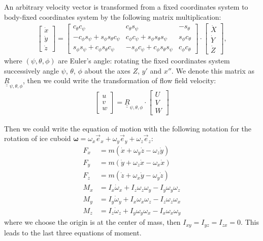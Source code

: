 \documentclass[a4paper, 12pt]{book}
\begin{document}
An arbitrary velocity vector is transformed from a fixed coordinates system to body-fixed coordinates system by the following matrix multiplication:
\begin{align}
    \begin{bmatrix}
        \dot{x} \\
        \dot{y} \\
        \dot{z}
    \end{bmatrix}
    =
    \begin{bmatrix}
        c_\theta c_\psi & c_\theta s_\psi & -s_\theta \\
        -c_\phi s_\psi + s_\phi s_\theta c_\psi & c_\phi c_\psi + s_\phi s_\theta s_\psi & s_\phi c_\theta \\
        s_\phi s_\psi + c_\phi s_\theta c_\psi & -s_\phi c_\psi + c_\phi s_\theta s_\psi & c_\phi c_\theta
    \end{bmatrix}\cdot
    \begin{bmatrix}
        \dot{X} \\
        \dot{Y} \\
        \dot{Z}
    \end{bmatrix},
\end{align}
where $(\psi, \theta, \phi)$ are Euler's angle: rotating the fixed coordinates system successively angle $\psi$, $\theta$, $\phi$ about the axes $Z$, $y'$ and $x''$. We denote this matrix as $\underline{\underline{R}}_{\psi, \theta, \phi}$, then we could write the transformation of flow field velocity:
\begin{align}
    \begin{bmatrix}
        u \\
        v \\
        w
    \end{bmatrix}
    = \underline{\underline{R}}_{\psi, \theta, \phi}
    \cdot
    \begin{bmatrix}
        U \\
        V \\
        W
    \end{bmatrix}
\end{align}

Then we could write the equation of motion with the following notation for the rotation of ice cuboid $\boldsymbol{\omega} = \omega_x \vec{e}_x + \omega_y \vec{e}_y + \omega_z \vec{e}_z$:
\begin{align}
    F_x & = m(\dot{x} + \omega_y \dot{z} - \omega_z \dot{y}) \\
    F_y & = m(\dot{y} + \omega_z \dot{x} - \omega_x \dot{x}) \\
    F_z & = m(\dot{z} + \omega_x \dot{y} - \omega_y \dot{z}) \\
    M_x & = I_x\dot{\omega}_x + I_z\omega_z \omega_y - I_y \omega_y \omega_z \\
    M_y & = I_y\dot{\omega}_y + I_x\omega_x \omega_z - I_z\omega_z \omega_x \\
    M_z & = I_z\dot{\omega}_z + I_y\omega_y \omega_x - I_x\omega_x \omega_y
\end{align}
where we choose the origin is at the center of mass, then $I_{xy} = I_{yz} = I_{zx} = 0$. This leads to the last three equations of moment.
\end{document}
